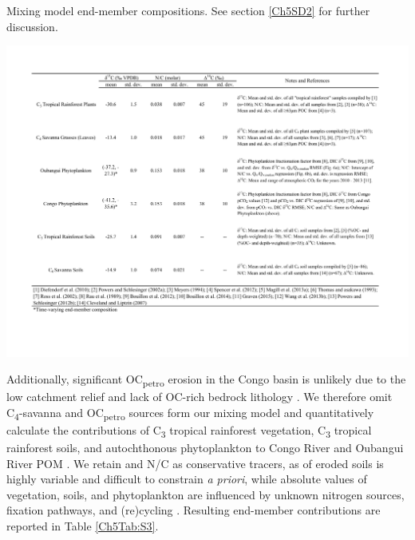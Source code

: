 \begin{table}
	\caption[Mixing model end-member compositions]{Mixing model end-member compositions. See section \ref{Ch5SD2} for further discussion.}
	\centering
		\includegraphics{Thesis_Tables/Ch5Tab3}
	\label{Ch5Tab:3} 
\end{table}

Additionally, significant OC\textsubscript{petro} erosion in the Congo basin is unlikely due to the low catchment relief and lack of OC-rich bedrock lithology \citep{Copard:2007bf,Milliman:2011ug}. We therefore omit C\textsubscript{4}-savanna and OC\textsubscript{petro} sources form our mixing model and quantitatively calculate the contributions of C\textsubscript{3} tropical rainforest vegetation, C\textsubscript{3} tropical rainforest soils, and autochthonous phytoplankton to Congo River \citep[][this study]{Spencer:2016ho} and Oubangui River POM \citep{Bouillon:2012cw,Bouillon:2014ko}. We retain  and N/C as conservative tracers, as  of eroded soils is highly variable and difficult to constrain \textit{a priori}, while absolute  values of vegetation, soils, and phytoplankton are influenced by unknown nitrogen sources, fixation pathways, and (re)cycling \citep{Martinelli:1999ta,Kendall:2001bs}. Resulting end-member contributions are reported in Table \ref{Ch5Tab:S3}. 

